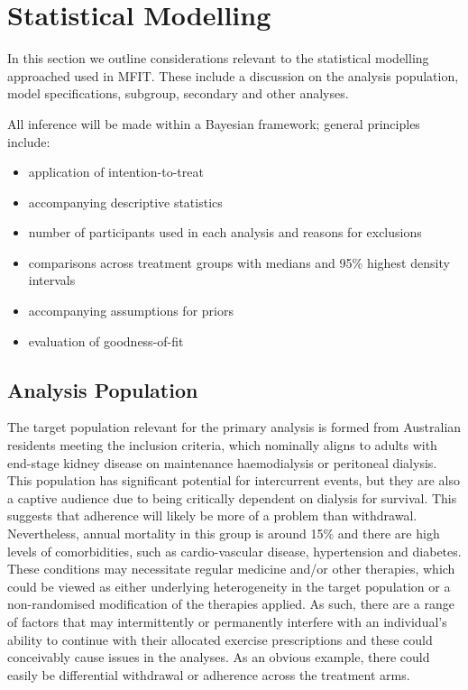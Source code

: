 \documentclass[
]{article}
\begin{document}
\hypertarget{statistical-modelling}{%
\section{Statistical Modelling}\label{statistical-modelling}}

In this section we outline considerations relevant to the statistical modelling approached used in MFIT.
These include a discussion on the analysis population, model specifications, subgroup, secondary and other analyses.

All inference will be made within a Bayesian framework; general principles include:

\begin{itemize}
\item application of intention-to-treat
\item accompanying descriptive statistics
\item number of participants used in each analysis and reasons for exclusions
\item comparisons across treatment groups with medians and 95\% highest density intervals
\item accompanying assumptions for priors
\item evaluation of goodness-of-fit
\end{itemize}

\hypertarget{analysis-population}{%
\subsection{Analysis Population}\label{analysis-population}}

The target population relevant for the primary analysis is formed from Australian residents meeting the inclusion criteria, which nominally aligns to adults with end-stage kidney disease on  maintenance haemodialysis or peritoneal dialysis.
This population has significant potential for intercurrent events, but they are also a captive audience due to being critically dependent on dialysis for survival.
This suggests that adherence will likely be more of a problem than withdrawal.
Nevertheless, annual mortality in this group is around 15\% and there are high levels of  comorbidities, such as cardio-vascular disease, hypertension and diabetes.
These conditions may necessitate regular medicine and/or other therapies, which could be viewed as either underlying heterogeneity in the target population or a non-randomised modification of the therapies applied.
As such, there are a range of factors that may intermittently or permanently interfere with an individual's ability to continue with their allocated exercise prescriptions and these could conceivably cause issues in the analyses.
As an obvious example, there could easily be differential withdrawal or adherence across the treatment arms.
\end{document}
